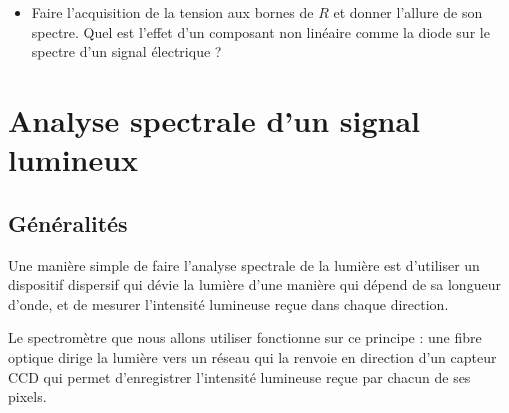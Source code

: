 \documentclass{tp}
\begin{document}
\begin{itemize}
  \item Faire l'acquisition de la tension aux bornes de $R$ et donner l'allure de son spectre. Quel est l'effet d'un composant non linéaire comme la diode sur le spectre d'un signal électrique ?
\end{itemize}




\section{Analyse spectrale d'un signal lumineux}%
\label{sec:analyse_spectrale_d_un_signal_lumineux}
\subsection{Généralités}%
\label{sub:generalites}

Une manière simple de faire l'analyse spectrale de la lumière est d'utiliser un dispositif dispersif qui dévie la lumière d'une manière qui dépend de sa longueur d'onde, et de mesurer l'intensité lumineuse reçue dans chaque direction.

Le spectromètre que nous allons utiliser fonctionne sur ce principe : une fibre optique dirige la lumière vers un réseau qui la renvoie en direction d'un capteur CCD qui permet d'enregistrer l'intensité lumineuse reçue par chacun de ses pixels.

\begin{center}
\def\svgwidth{8cm}
  
\end{center}
\end{document}
